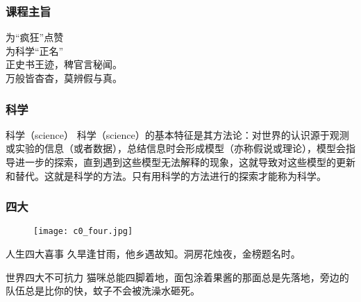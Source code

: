 \begin{frame}[fragile]
  \frametitle{课程主旨}
  \begin{center}
  {\Huge 为“疯狂”点赞\\
    \vspace{0.5cm}
    为科学“正名”}\\
  \vspace{1cm}
  {\Large 正史书王迹，稗官言秘闻。\\
    \vspace{0.2cm}
    万般皆杳杳，莫辨假与真。}
\end{center}
\end{frame}

\begin{frame}
  \frametitle{科学}
  \begin{block}{科学（science）}
科学（science）的基本特征是其方法论：对世界的认识源于观测或实验的信息（或者数据），总结信息时会形成模型（亦称假说或理论），模型会指导进一步的探索，直到遇到这些模型无法解释的现象，这就导致对这些模型的更新和替代。这就是科学的方法。只有用科学的方法进行的探索才能称为科学。
  \end{block}
\end{frame}

\begin{frame}
  \frametitle{四大}
  \vspace{-0.5em}
  \begin{figure}
    \centering
    \texttt{[image: c0\_four.jpg]}
  \end{figure}
  \vspace{-0.5em}
  \begin{block}{人生四大喜事}
    久旱逢甘雨，他乡遇故知。洞房花烛夜，金榜题名时。
  \end{block}
  \pause
  \begin{block}{世界四大不可抗力}
    猫咪总能四脚着地，面包涂着果酱的那面总是先落地，旁边的队伍总是比你的快，蚊子不会被洗澡水砸死。
  \end{block}
\end{frame}


